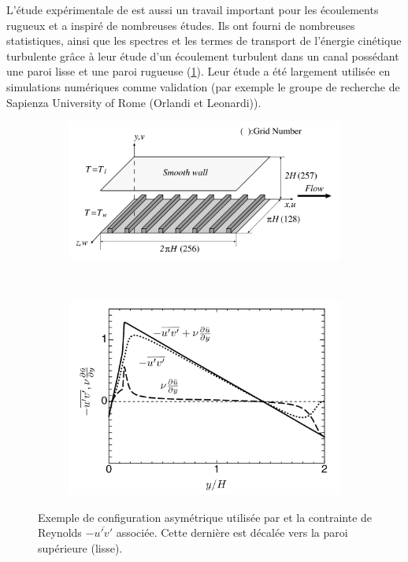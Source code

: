 L'étude expérimentale de \cite{Hanjalic1972} est aussi un travail important pour les écoulements rugueux et a inspiré de nombreuses études. Ils ont fourni de nombreuses statistiques, ainsi que les spectres et les termes de transport de l'énergie cinétique turbulente grâce à leur étude d'un écoulement turbulent dans un canal possédant une paroi lisse et une paroi rugueuse (\cref{fig/asym_roughness_distrib}). Leur étude a été largement utilisée en simulations numériques comme validation (par exemple le groupe de recherche de Sapienza University of Rome (Orlandi et Leonardi)).\\

\begin{figure}[!hbtp]
    \centering
    \captionsetup[subfigure]{justification=centering}
    \begin{subfigure}[b]{\textwidth}
        \centering
        \includegraphics[width=0.7\linewidth]{Chap1/Pictures/Ecoulement_rugueux/asym_rough_miyake.png}
    \end{subfigure}\\
    \begin{subfigure}[b]{\textwidth}
        \centering
        \includegraphics[width=.65\linewidth]{Chap1/Pictures/Ecoulement_rugueux/asym_rough_uv_miyake.png}
    \end{subfigure}
    \caption{Exemple de configuration asymétrique utilisée par \citet{Miyake2001} et la contrainte de Reynolds $-\overline{u'v'}$ associée. Cette dernière est décalée vers la paroi supérieure (lisse).}
    \label{fig/asym_roughness_distrib}
\end{figure}


